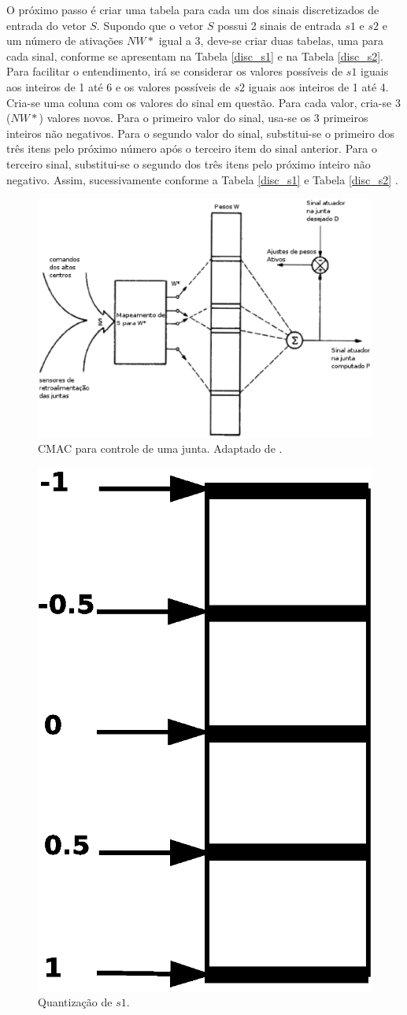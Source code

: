 O próximo passo é criar uma tabela para cada um dos sinais discretizados de entrada do vetor $S$. 
Supondo que o vetor $S$ possui 2 sinais de entrada $s1$ e $s2$ e um número de ativações $NW*$ igual a 3, deve-se criar duas tabelas, uma para cada sinal, conforme se apresentam na Tabela \ref{disc_s1} e na Tabela \ref{disc_s2}. 
Para facilitar o entendimento, irá se considerar os valores possíveis de $s1$ iguais aos inteiros de 1 até 6 e os valores possíveis de $s2$ iguais aos inteiros de 1 até 4.
Cria-se uma coluna com os valores do sinal em questão. 
Para cada valor, cria-se 3 ($NW*$) valores novos. 
Para o primeiro valor do sinal, usa-se os 3 primeiros inteiros não negativos.
Para o segundo valor do sinal, substitui-se o primeiro dos três itens pelo próximo número após o terceiro item do sinal anterior. 
Para o terceiro sinal, substitui-se o segundo dos três itens pelo próximo inteiro não negativo.
Assim, sucessivamente conforme a Tabela \ref{disc_s1} e Tabela \ref{disc_s2} \cite{Albus1975b}.

\begin{figure}[ht]
	\centering
	\includegraphics[width=15 cm]{figuras/cmac1.eps}
	\caption{CMAC para controle de uma junta. Adaptado de \cite{Albus1975b}.}
    	\label{fig1}
\end{figure}


\begin{figure}[ht]
	\centering
	\includegraphics[width=3 cm]{figuras/input.eps}
	\caption{Quantização de $s1$.}
    	\label{inputs1}
\end{figure}

